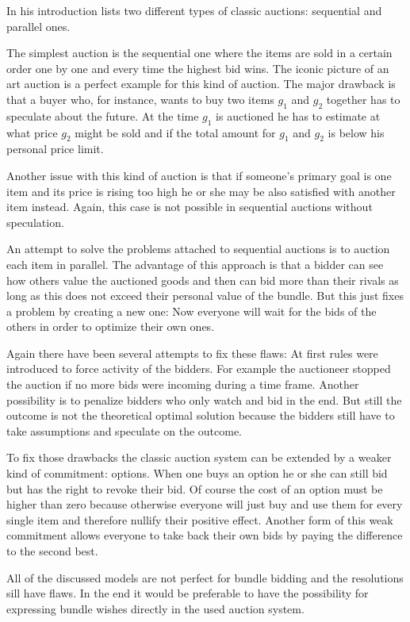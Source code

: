 \documentclass[a4paper]{paper}
\begin{document}
In his introduction \cite{San02} lists two different types of classic auctions: sequential and parallel ones.

The simplest auction is the sequential one where the items are sold in a certain order one by one and every time the highest bid wins. The iconic picture of an art auction is a perfect example for this kind of auction. The major drawback is that a buyer who, for instance, wants to buy two items $g_1$ and $g_2$ together has to speculate about the future. At the time $g_1$ is auctioned he has to estimate at what price $g_2$ might be sold and if the total amount for $g_1$ and $g_2$ is below his personal price limit.

Another issue with this kind of auction is that if someone's primary goal is one item and its price is rising too high he or she may be also satisfied with another item instead. Again, this case is not possible in sequential auctions without speculation.

An attempt to solve the problems attached to sequential auctions is to auction each item in parallel. The advantage of this approach is that a bidder can see how others value the auctioned goods and then can bid more than their rivals as long as this does not exceed their personal value of the bundle. But this just fixes a problem by creating a new one: Now everyone will wait for the bids of the others in order to optimize their own ones.

Again there have been several attempts to fix these flaws: At first rules were introduced to force activity of the bidders. For example the auctioneer stopped the auction if no more bids were incoming during a time frame. Another possibility is to penalize bidders who only watch and bid in the end. But still the outcome is not the theoretical optimal solution because the bidders still have to take assumptions and speculate on the outcome.

To fix those drawbacks the classic auction system can be extended by a weaker kind of commitment: options. When one buys an option he or she can still bid but has the right to revoke their bid. Of course the cost of an option must be higher than zero because otherwise everyone will just buy and use them for every single item and therefore nullify their positive effect. Another form of this weak commitment allows everyone to take back their own bids by paying the difference to the second best.~\cite[Chapter~1.3]{San02}

All of the discussed models are not perfect for bundle bidding and the resolutions sill have flaws. In the end it would be preferable to have the possibility for expressing bundle wishes directly in the used auction system.
\end{document}
